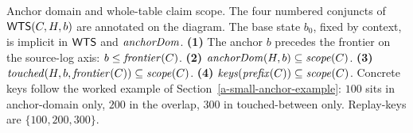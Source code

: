 \caption{Anchor domain and whole-table claim scope. The four numbered
conjuncts of $\WholeTableClaimScope(C, H, b)$ are annotated on the
diagram. The base state $b_0$, fixed by context, is implicit in
$\WholeTableClaimScope$ and $\AnchorDomain$. \textbf{(1)} The anchor $b$ precedes the frontier on the
source-log axis: $b \le \Frontier(C)$.
\textbf{(2)} $\AnchorDomain(H, b) \subseteq \Scope(C)$.
\textbf{(3)} $\TouchedBetween(H, b, \Frontier(C)) \subseteq \Scope(C)$.
\textbf{(4)} $\ReplayKeys(\CleanPrefix(C)) \subseteq \Scope(C)$.
Concrete keys follow the worked example of Section~\ref{a-small-anchor-example}: $100$ sits in
anchor-domain only, $200$ in the overlap, $300$ in touched-between
only. Replay-keys are $\{100, 200, 300\}$.}
\label{fig:whole-table-claim-scope}
